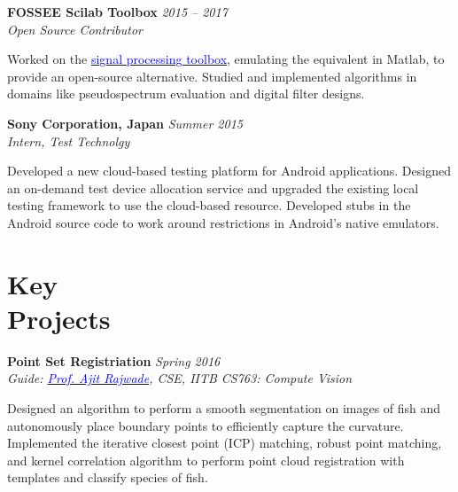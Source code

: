 \documentclass[margin,line,hidelinks]{res}
\newenvironment{list1}{
  \begin{list}{\ding{113}}{%
      \setlength{\itemsep}{0in}
      \setlength{\parsep}{0in} \setlength{\parskip}{0in}
      \setlength{\topsep}{0in} \setlength{\partopsep}{0in} 
      \setlength{\leftmargin}{0.17in}}}{\end{list}}
\begin{document}
\begin{resume}
{\bf FOSSEE Scilab Toolbox} \hfill {\it 2015 -- 2017} \\
{\em Open Source Contributor} \\
\vspace*{-.15in}
\begin{list1}
\item[] Worked on the \href{https://scilab.in/fossee-scilab-toolbox/signal-processing-toolbox}{\textcolor{blue}{signal processing toolbox}}, emulating the equivalent in Matlab, to provide an open-source alternative. Studied and implemented algorithms in domains like pseudospectrum evaluation and digital filter designs.
\end{list1}

{\bf Sony Corporation, Japan} \hfill {\it Summer 2015 } \\
{\em Intern, Test Technolgy}\\
\vspace*{-.15in}
\begin{list1}
\item[] Developed a new cloud-based testing platform for Android applications. Designed an on-demand test device allocation service and upgraded the existing local testing framework to use the cloud-based resource. Developed stubs in the Android source code to work around restrictions in Android's native emulators.
\end{list1}

\vspace*{-0.1in}


\section{\sc Key \\Projects}
{\bf Point Set Registriation} \hfill {\it Spring 2016} \\
{\em Guide: \href{https://www.cse.iitb.ac.in/~ajitvr}{\textcolor{blue}{Prof. Ajit Rajwade}}, CSE, IITB \hfill CS763: Compute Vision} \\
\vspace*{-.15in}
\begin{list1}
\item[] Designed an algorithm to perform a smooth segmentation on images of fish and autonomously place boundary points to efficiently capture the curvature. Implemented the iterative closest point (ICP) matching, robust point matching, and kernel correlation algorithm to perform point cloud registration with templates and classify species of fish.
\end{list1}


\end{resume}
\end{document}
